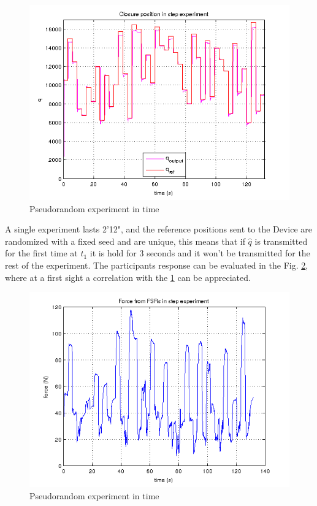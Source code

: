 \begin{figure}[h]
\includegraphics[width=\textwidth]{Figure/pseudorandom_q.png}
  \caption{Pseudorandom experiment in time}
  \label{Fig:pseudo}
\end{figure}


A single experiment lasts 2'12", and the reference positions sent to the Device are randomized with a fixed seed and are unique, this means that if $\hat{q}$ is transmitted for the first time at $t_1$ it is hold for 3 seconds and it won't be transmitted for the rest of the experiment.
The participants response can be evaluated in the Fig. \ref{Fig:pseudoforce}, where at a first sight a correlation with the \ref{Fig:pseudo} can be appreciated. 

\begin{figure}[h]
\includegraphics[width=\textwidth]{Figure/pseudoforce.png}
  \caption{Pseudorandom experiment in time}
  \label{Fig:pseudoforce}
\end{figure}

